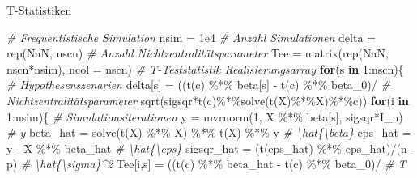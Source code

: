 \documentclass[
  8pt,
  ignorenonframetext,
]{beamer}
\newenvironment{Shaded}{\begin{snugshade}}{\end{snugshade}}
\newcommand{\AttributeTok}[1]{\textcolor[rgb]{0.77,0.63,0.00}{#1}}
\newcommand{\CommentTok}[1]{\textcolor[rgb]{0.56,0.35,0.01}{\textit{#1}}}
\newcommand{\ConstantTok}[1]{\textcolor[rgb]{0.00,0.00,0.00}{#1}}
\newcommand{\ControlFlowTok}[1]{\textcolor[rgb]{0.13,0.29,0.53}{\textbf{#1}}}
\newcommand{\DecValTok}[1]{\textcolor[rgb]{0.00,0.00,0.81}{#1}}
\newcommand{\FloatTok}[1]{\textcolor[rgb]{0.00,0.00,0.81}{#1}}
\newcommand{\FunctionTok}[1]{\textcolor[rgb]{0.00,0.00,0.00}{#1}}
\newcommand{\NormalTok}[1]{#1}
\newcommand{\OtherTok}[1]{\textcolor[rgb]{0.56,0.35,0.01}{#1}}
\newcommand{\SpecialCharTok}[1]{\textcolor[rgb]{0.00,0.00,0.00}{#1}}
\begin{document}
\begin{frame}[fragile]{T-Statistiken}
\begin{Shaded}
\begin{Highlighting}[]
\CommentTok{\# Frequentistische Simulation}
\NormalTok{nsim       }\OtherTok{=} \FloatTok{1e4}                                               \CommentTok{\# Anzahl Simulationen}
\NormalTok{delta      }\OtherTok{=} \FunctionTok{rep}\NormalTok{(}\ConstantTok{NaN}\NormalTok{, nscn)                                    }\CommentTok{\# Anzahl Nichtzentralitätsparameter}
\NormalTok{Tee        }\OtherTok{=} \FunctionTok{matrix}\NormalTok{(}\FunctionTok{rep}\NormalTok{(}\ConstantTok{NaN}\NormalTok{, nscn}\SpecialCharTok{*}\NormalTok{nsim), }\AttributeTok{ncol =}\NormalTok{ nscn)          }\CommentTok{\# T{-}Teststatistik Realisierungsarray}
\ControlFlowTok{for}\NormalTok{(s }\ControlFlowTok{in} \DecValTok{1}\SpecialCharTok{:}\NormalTok{nscn)\{                                              }\CommentTok{\# Hypothesenszenarien}
\NormalTok{  delta[s]    }\OtherTok{=}\NormalTok{ ((}\FunctionTok{t}\NormalTok{(c) }\SpecialCharTok{\%*\%}\NormalTok{ beta[s] }\SpecialCharTok{{-}} \FunctionTok{t}\NormalTok{(c) }\SpecialCharTok{\%*\%}\NormalTok{ beta\_0)}\SpecialCharTok{/}         \CommentTok{\# Nichtzentralitätsparameter}
                \FunctionTok{sqrt}\NormalTok{(sigsqr}\SpecialCharTok{*}\FunctionTok{t}\NormalTok{(c)}\SpecialCharTok{\%*\%}\FunctionTok{solve}\NormalTok{(}\FunctionTok{t}\NormalTok{(X)}\SpecialCharTok{\%*\%}\NormalTok{X)}\SpecialCharTok{\%*\%}\NormalTok{c))}
  \ControlFlowTok{for}\NormalTok{(i }\ControlFlowTok{in} \DecValTok{1}\SpecialCharTok{:}\NormalTok{nsim)\{                                            }\CommentTok{\# Simulationsiterationen}
\NormalTok{    y          }\OtherTok{=} \FunctionTok{mvrnorm}\NormalTok{(}\DecValTok{1}\NormalTok{, X }\SpecialCharTok{\%*\%}\NormalTok{ beta[s], sigsqr}\SpecialCharTok{*}\NormalTok{I\_n)         }\CommentTok{\# y}
\NormalTok{    beta\_hat   }\OtherTok{=} \FunctionTok{solve}\NormalTok{(}\FunctionTok{t}\NormalTok{(X) }\SpecialCharTok{\%*\%}\NormalTok{ X) }\SpecialCharTok{\%*\%} \FunctionTok{t}\NormalTok{(X) }\SpecialCharTok{\%*\%}\NormalTok{ y              }\CommentTok{\# \textbackslash{}hat\{\textbackslash{}beta\}}
\NormalTok{    eps\_hat    }\OtherTok{=}\NormalTok{ y }\SpecialCharTok{{-}}\NormalTok{ X }\SpecialCharTok{\%*\%}\NormalTok{ beta\_hat                            }\CommentTok{\# \textbackslash{}hat\{\textbackslash{}eps\}}
\NormalTok{    sigsqr\_hat }\OtherTok{=}\NormalTok{ (}\FunctionTok{t}\NormalTok{(eps\_hat) }\SpecialCharTok{\%*\%}\NormalTok{ eps\_hat)}\SpecialCharTok{/}\NormalTok{(n}\SpecialCharTok{{-}}\NormalTok{p)                }\CommentTok{\# \textbackslash{}hat\{\textbackslash{}sigma\}\^{}2}
\NormalTok{    Tee[i,s]   }\OtherTok{=}\NormalTok{ ((}\FunctionTok{t}\NormalTok{(c) }\SpecialCharTok{\%*\%}\NormalTok{ beta\_hat }\SpecialCharTok{{-}} \FunctionTok{t}\NormalTok{(c) }\SpecialCharTok{\%*\%}\NormalTok{ beta\_0)}\SpecialCharTok{/}       \CommentTok{\# T}

\end{Highlighting}
\end{Shaded}
\end{frame}
\end{document}
